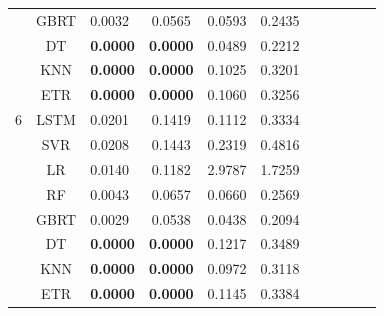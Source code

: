 {\begin{longtable}{cclcccccccc}
   & GBRT & 0.0032 & 0.0565 & 0.0593 & 0.2435  \\
   & DT & \textbf{0.0000} & \textbf{0.0000} & 0.0489 & 0.2212 \\
   & KNN & \textbf{0.0000} & \textbf{0.0000} & 0.1025 & 0.3201 \\
   & ETR & \textbf{0.0000} & \textbf{0.0000} & 0.1060 & 0.3256 \\
  \hline
  6 & LSTM & 0.0201 & 0.1419 & 0.1112 & 0.3334 \\
   & SVR & 0.0208 & 0.1443 & 0.2319 & 0.4816 \\
   & LR & 0.0140 & 0.1182 & 2.9787 & 1.7259 \\
   & RF & 0.0043 & 0.0657 & 0.0660 & 0.2569 \\
   & GBRT & 0.0029 & 0.0538 & 0.0438 & 0.2094 \\
   & DT & \textbf{0.0000} & \textbf{0.0000} & 0.1217 & 0.3489 \\
   & KNN & \textbf{0.0000} & \textbf{0.0000} & 0.0972 & 0.3118 \\
   & ETR & \textbf{0.0000} & \textbf{0.0000} & 0.1145 & 0.3384 \\
\end{longtable}
}


